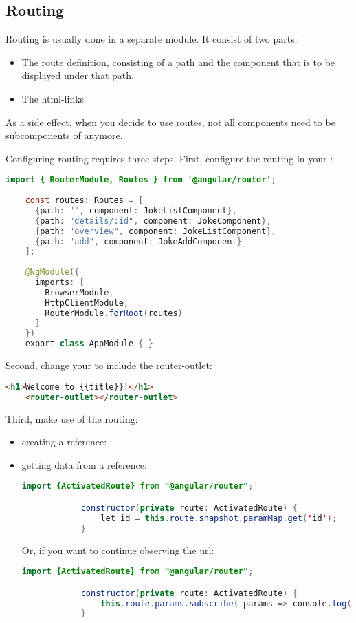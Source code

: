 \subsection{Routing}
Routing is usually done in a separate module. It consist of two parts: 
\begin{itemize}
    \item The route definition, consisting of a path and the component that is to be displayed under that path.
    \item The html-links
\end{itemize}
As a side effect, when you decide to use routes, not all components need to be subcomponents of  anymore.

Configuring routing requires three steps. First, configure the routing in your : 
\begin{lstlisting}[language=java]
    import { RouterModule, Routes } from '@angular/router';
    
    const routes: Routes = [
      {path: "", component: JokeListComponent},
      {path: "details/:id", component: JokeComponent},
      {path: "overview", component: JokeListComponent},
      {path: "add", component: JokeAddComponent}
    ];
    
    @NgModule({
      imports: [
        BrowserModule,
        HttpClientModule,
        RouterModule.forRoot(routes)
      ]
    })
    export class AppModule { }
\end{lstlisting}

Second, change your  to include the router-outlet:
\begin{lstlisting}[language=html]
    <h1>Welcome to {{title}}!</h1>
    <router-outlet></router-outlet>
\end{lstlisting}

Third, make use of the routing:
\begin{itemize}
    \item creating a reference: 
    \item getting data from a reference: 
        \begin{lstlisting}[language=java]
            import {ActivatedRoute} from "@angular/router";

            constructor(private route: ActivatedRoute) {
                let id = this.route.snapshot.paramMap.get('id');
            }
        \end{lstlisting}
        Or, if you want to continue observing the url:
        \begin{lstlisting}[language=java]
            import {ActivatedRoute} from "@angular/router";

            constructor(private route: ActivatedRoute) {
                this.route.params.subscribe( params => console.log(params) );
            }
        \end{lstlisting}
\end{itemize}


